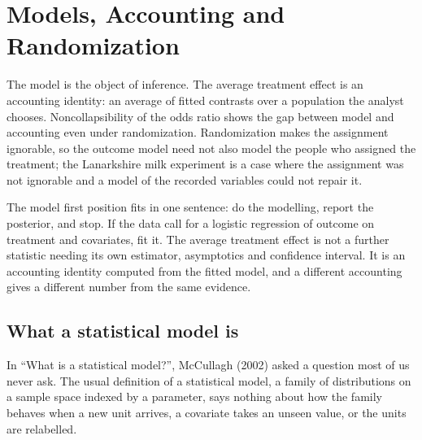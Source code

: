 \chapter{Models, Accounting and Randomization}\label{ch:mccullagh}

\begin{tcolorbox}[colback=gray!6,colframe=gray!50,title=In brief,fonttitle=\normalfont\itshape,coltitle=black,colbacktitle=gray!15,boxrule=0.4pt,arc=1pt]
The model is the object of inference. The average treatment effect is an accounting identity: an average of fitted contrasts over a population the analyst chooses. Noncollapsibility of the odds ratio shows the gap between model and accounting even under randomization. Randomization makes the assignment ignorable, so the outcome model need not also model the people who assigned the treatment; the Lanarkshire milk experiment is a case where the assignment was not ignorable and a model of the recorded variables could not repair it.
\end{tcolorbox}

The model first position fits in one sentence: do the modelling, report the posterior, and stop. If the data call for a logistic regression of outcome on treatment and covariates, fit it. The average treatment effect is not a further statistic needing its own estimator, asymptotics and confidence interval. It is an accounting identity computed from the fitted model, and a different accounting gives a different number from the same evidence.

\section{What a statistical model is}

In ``What is a statistical model?'', McCullagh (2002) asked a question most of us never ask. The usual definition of a statistical model, a family of distributions on a sample space indexed by a parameter, says nothing about how the family behaves when a new unit arrives, a covariate takes an unseen value, or the units are relabelled.


